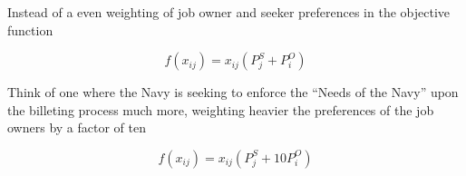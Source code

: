 Instead of a even weighting of job owner and seeker preferences in the objective function

\[f(x_{ij}) = x_{ij}(P^S_j + P^O_i)\]

Think of one where the Navy is seeking to enforce the ``Needs of the Navy'' upon the billeting process much more, weighting heavier the preferences of the job owners by a factor of ten

\[f(x_{ij}) = x_{ij}(P^S_j + 10P^O_i)\]
